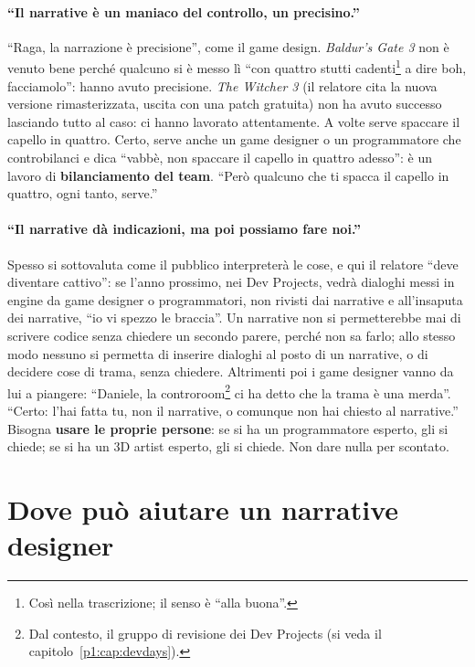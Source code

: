 \paragraph{``Il narrative è un maniaco del controllo, un precisino.''} ``Raga,
la narrazione è precisione'', come il game design. \emph{Baldur's Gate 3} non
è venuto bene perché qualcuno si è messo lì ``con quattro stutti
cadenti\footnote{Così nella trascrizione; il senso è ``alla buona''.} a dire
boh, facciamolo'': hanno avuto precisione. \emph{The Witcher 3} (il relatore
cita la nuova versione rimasterizzata, uscita con una patch gratuita) non ha
avuto successo lasciando tutto al caso: ci hanno lavorato attentamente. A
volte serve spaccare il capello in quattro. Certo, serve anche un game
designer o un programmatore che controbilanci e dica ``vabbè, non spaccare il
capello in quattro adesso'': è un lavoro di \textbf{bilanciamento del team}.
``Però qualcuno che ti spacca il capello in quattro, ogni tanto, serve.''

\paragraph{``Il narrative dà indicazioni, ma poi possiamo fare noi.''} Spesso
si sottovaluta come il pubblico interpreterà le cose, e qui il relatore
``deve diventare cattivo'': se l'anno prossimo, nei Dev Projects, vedrà
dialoghi messi in engine da game designer o programmatori, non rivisti dai
narrative e all'insaputa dei narrative, ``io vi spezzo le braccia''. Un
narrative non si permetterebbe mai di scrivere codice senza chiedere un
secondo parere, perché non sa farlo; allo stesso modo nessuno si permetta di
inserire dialoghi al posto di un narrative, o di decidere cose di trama, senza
chiedere. Altrimenti poi i game designer vanno da lui a piangere: ``Daniele, la
controroom\footnote{Dal contesto, il gruppo di revisione dei Dev Projects
(si veda il capitolo~\ref{p1:cap:devdays}).} ci ha detto che la trama è una
merda''. ``Certo: l'hai fatta tu, non il narrative, o comunque non hai chiesto
al narrative.'' Bisogna \textbf{usare le proprie persone}: se si ha un
programmatore esperto, gli si chiede; se si ha un 3D artist esperto, gli si
chiede. Non dare nulla per scontato.

\section{Dove può aiutare un narrative designer}
\label{p3:sec:aiuto}

